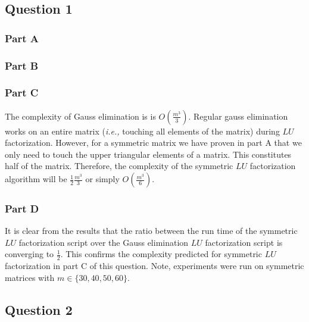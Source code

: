 \subsection{Question 1}
\subsubsection{Part A}

\newpage
\subsubsection{Part B}



\subsubsection{Part C}
The complexity of Gauss elimination is is \(O(\frac{m^{3}}{3})\).
Regular gauss elimination works on an entire matrix ({\em i.e.,} touching all elements of the matrix) during \(LU\) factorization.
However, for a symmetric matrix we have proven in part A that we only need to touch the upper triangular elements of a matrix.
This constitutes half of the matrix.
Therefore, the complexity of the symmetric \(LU\) factorization algorithm will be \(\frac{1}{2}\frac{m^{3}}{3}\) or simply \(O(\frac{m^{3}}{6})\).

\newpage
\subsubsection{Part D}




It is clear from the results that the ratio between the run time of the symmetric \(LU\) factorization script over the Gauss elimination \(LU\) factorization script is converging to \(\frac{1}{2}\).
This confirms the complexity predicted for symmetric \(LU\) factorization in part C of this question.
Note, experiments were run on symmetric matrices with \(m \in \{30,40,50,60 \}\).

\newpage
\subsection{Question 2}

